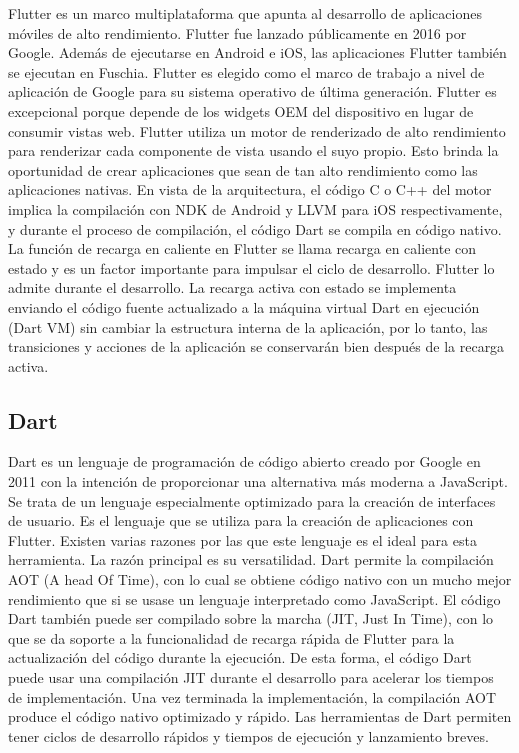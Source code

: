 \documentclass[]{article}
\begin{document}
Flutter es un marco multiplataforma que apunta al desarrollo de aplicaciones móviles de alto rendimiento.
Flutter fue lanzado públicamente en 2016 por Google. Además de ejecutarse en Android e iOS, las aplicaciones Flutter
también se ejecutan en Fuschia. Flutter es elegido como el marco de trabajo a nivel de aplicación de Google para su sistema operativo de
última generación. Flutter es excepcional porque depende de los widgets OEM del dispositivo en lugar de consumir vistas web. Flutter utiliza un motor de renderizado de alto rendimiento para renderizar cada componente de vista
usando el suyo propio. Esto brinda la oportunidad de crear aplicaciones que sean de tan alto rendimiento como las aplicaciones
nativas. En vista de la arquitectura, el código C o C++ del motor implica la compilación con NDK de Android y LLVM para iOS respectivamente, y durante el proceso de compilación, el código Dart se
compila en código nativo. La función de recarga en caliente en Flutter se llama recarga en caliente con estado y es un factor
importante para impulsar el ciclo de desarrollo. Flutter lo admite durante el desarrollo. La recarga activa con estado se
implementa enviando el código fuente actualizado a la máquina virtual Dart en ejecución (Dart VM)
sin cambiar la estructura interna de la aplicación, por lo tanto, las transiciones y acciones de la
aplicación se conservarán bien después de la recarga activa\cite{tashildar2020application}.

\subsection{Dart}

Dart es un lenguaje de programación de código abierto creado por Google en 2011 con la intención de proporcionar una alternativa más moderna a JavaScript. Se trata de un lenguaje especialmente optimizado para la creación de interfaces de usuario.
Es el lenguaje que se utiliza para la creación de aplicaciones con Flutter. Existen varias razones por las que este lenguaje es el ideal para esta herramienta. La razón principal es su versatilidad. Dart permite la compilación AOT (A head Of Time), con lo cual se obtiene código nativo con un mucho mejor rendimiento que si se usase un lenguaje interpretado como JavaScript. El código Dart también puede ser compilado sobre la marcha (JIT, Just In Time), con lo que se da soporte a la funcionalidad de recarga rápida de Flutter para la actualización del código durante la ejecución.
De esta forma, el código Dart puede usar una compilación JIT durante el desarrollo para acelerar los tiempos de implementación. Una vez terminada la implementación, la compilación AOT produce el código nativo optimizado y rápido. Las herramientas de Dart permiten tener ciclos de desarrollo rápidos y tiempos de ejecución y lanzamiento breves.
\end{document}
